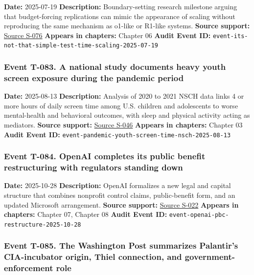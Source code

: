 \documentclass[
  american,
  11pt,
  letterpaper,
]{article}
\begin{document}
\textbf{Date:} 2025-07-19 \textbf{Description:} Boundary-setting
research milestone arguing that budget-forcing replications can mimic
the appearance of scaling without reproducing the same mechanism as
o1-like or R1-like systems. \textbf{Source support:}
\hyperref[source-s-076-it-s-not-that-simple-an-analysis-of-simple-test-time-scaling]{Source
S-076} \textbf{Appears in chapters:} Chapter 06 \textbf{Audit Event ID:}
\texttt{event-its-not-that-simple-test-time-scaling-2025-07-19}

\subsubsection{Event T-083. A national study documents heavy youth
screen exposure during the pandemic
period}\label{event-t-083-a-national-study-documents-heavy-youth-screen-exposure-during-the-pandemic-period}

\textbf{Date:} 2025-08-13 \textbf{Description:} Analysis of 2020 to 2021
NSCH data links 4 or more hours of daily screen time among U.S. children
and adolescents to worse mental-health and behavioral outcomes, with
sleep and physical activity acting as mediators. \textbf{Source
support:}
\hyperref[source-s-046-excessive-screen-time-is-associated-with-mental-health-problems-and-adhd-in-us-children-and-adolescents-physical-activity-and-sleep-as-parallel-mediators]{Source
S-046} \textbf{Appears in chapters:} Chapter 03 \textbf{Audit Event ID:}
\texttt{event-pandemic-youth-screen-time-nsch-2025-08-13}

\subsubsection{Event T-084. OpenAI completes its public benefit
restructuring with regulators standing
down}\label{event-t-084-openai-completes-its-public-benefit-restructuring-with-regulators-standing-down}

\textbf{Date:} 2025-10-28 \textbf{Description:} OpenAI formalizes a new
legal and capital structure that combines nonprofit control claims,
public-benefit form, and an updated Microsoft arrangement.
\textbf{Source support:}
\hyperref[source-s-022-openai-may-move-forward-with-new-business-structure-partnership-with-microsoft-regulators-say]{Source
S-022} \textbf{Appears in chapters:} Chapter 07, Chapter 08
\textbf{Audit Event ID:}
\texttt{event-openai-pbc-restructure-2025-10-28}

\subsubsection{Event T-085. The Washington Post summarizes Palantir's
CIA-incubator origin, Thiel connection, and government-enforcement
role}\label{event-t-085-the-washington-post-summarizes-palantir-s-cia-incubator-origin-thiel-connection-and-government-enforcement-role}
\end{document}
